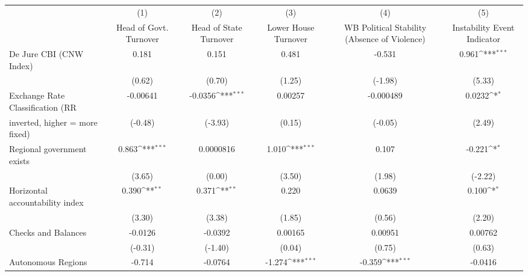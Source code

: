 {
\def\sym#1{\ifmmode^{#1}\else\(^{#1}\)\fi}
\begin{tabular}{l*{5}{c}}
\toprule
                                        &\multicolumn{1}{c}{(1)}&\multicolumn{1}{c}{(2)}&\multicolumn{1}{c}{(3)}&\multicolumn{1}{c}{(4)}&\multicolumn{1}{c}{(5)}\\
                                        &\multicolumn{1}{c}{Head of Govt. Turnover}&\multicolumn{1}{c}{Head of State Turnover}&\multicolumn{1}{c}{Lower House Turnover}&\multicolumn{1}{c}{WB Political Stability (Absence of Violence)}&\multicolumn{1}{c}{Instability Event Indicator}\\
\midrule
De Jure CBI (CNW Index)                 &     0.181         &     0.151         &     0.481         &    -0.531         &     0.961\sym{***}\\
                                        &    (0.62)         &    (0.70)         &    (1.25)         &   (-1.98)         &    (5.33)         \\
\addlinespace
Exchange Rate Classification (RR        &  -0.00641         &   -0.0356\sym{***}&   0.00257         & -0.000489         &    0.0232\sym{*}  \\
inverted, higher = more fixed)          &   (-0.48)         &   (-3.93)         &    (0.15)         &   (-0.05)         &    (2.49)         \\
\addlinespace
Regional government exists              &     0.863\sym{***}& 0.0000816         &     1.010\sym{***}&     0.107         &    -0.221\sym{*}  \\
                                        &    (3.65)         &    (0.00)         &    (3.50)         &    (1.98)         &   (-2.22)         \\
\addlinespace
Horizontal accountability index         &     0.390\sym{**} &     0.371\sym{**} &     0.220         &    0.0639         &     0.100\sym{*}  \\
                                        &    (3.30)         &    (3.38)         &    (1.85)         &    (0.56)         &    (2.20)         \\
\addlinespace
Checks and Balances                     &   -0.0126         &   -0.0392         &   0.00165         &   0.00951         &   0.00762         \\
                                        &   (-0.31)         &   (-1.40)         &    (0.04)         &    (0.75)         &    (0.63)         \\
\addlinespace
Autonomous Regions                      &    -0.714         &   -0.0764         &    -1.274\sym{***}&    -0.359\sym{***}&   -0.0416         \\

\end{tabular}}
